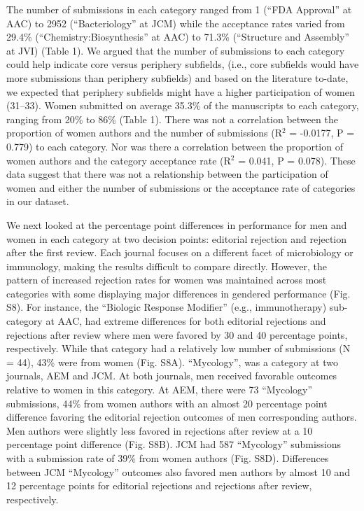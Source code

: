 \documentclass[11pt,]{article}
\begin{document}
The number of submissions in each category ranged from 1 (``FDA
Approval'' at AAC) to 2952 (``Bacteriology'' at JCM) while the
acceptance rates varied from 29.4\% (``Chemistry:Biosynthesis'' at AAC)
to 71.3\% (``Structure and Assembly'' at JVI) (Table 1). We argued that
the number of submissions to each category could help indicate core
versus periphery subfields, (i.e., core subfields would have more
submissions than periphery subfields) and based on the literature
to-date, we expected that periphery subfields might have a higher
participation of women (31--33). Women submitted on average 35.3\% of
the manuscripts to each category, ranging from 20\% to 86\% (Table 1).
There was not a correlation between the proportion of women authors and
the number of submissions (R\({^2}\) = -0.0177, P = 0.779) to each
category. Nor was there a correlation between the proportion of women
authors and the category acceptance rate (R\({^2}\) = 0.041, P = 0.078).
These data suggest that there was not a relationship between the
participation of women and either the number of submissions or the
acceptance rate of categories in our dataset.

We next looked at the percentage point differences in performance for
men and women in each category at two decision points: editorial
rejection and rejection after the first review. Each journal focuses on
a different facet of microbiology or immunology, making the results
difficult to compare directly. However, the pattern of increased
rejection rates for women was maintained across most categories with
some displaying major differences in gendered performance (Fig. S8). For
instance, the ``Biologic Response Modifier'' (e.g., immunotherapy)
sub-category at AAC, had extreme differences for both editorial
rejections and rejections after review where men were favored by 30 and
40 percentage points, respectively. While that category had a relatively
low number of submissions (N = 44), 43\% were from women (Fig. S8A).
``Mycology'', was a category at two journals, AEM and JCM. At both
journals, men received favorable outcomes relative to women in this
category. At AEM, there were 73 ``Mycology'' submissions, 44\% from
women authors with an almost 20 percentage point difference favoring the
editorial rejection outcomes of men corresponding authors. Men authors
were slightly less favored in rejections after review at a 10 percentage
point difference (Fig. S8B). JCM had 587 ``Mycology'' submissions with a
submission rate of 39\% from women authors (Fig. S8D). Differences
between JCM ``Mycology'' outcomes also favored men authors by almost 10
and 12 percentage points for editorial rejections and rejections after
review, respectively.
\end{document}
